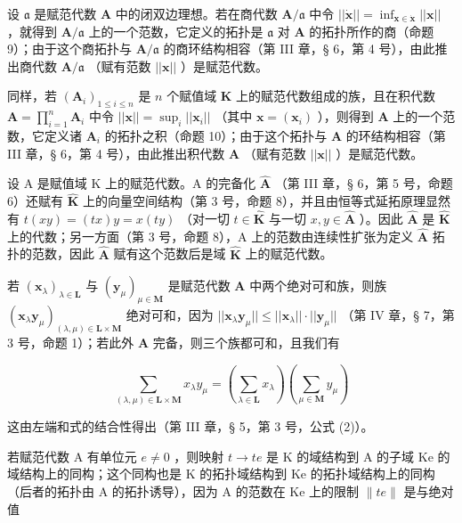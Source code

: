 设 \(\mathfrak{a}\) 是赋范代数 \(\mathbf{A}\) 中的闭双边理想。若在商代数 \(\mathbf{A} / \mathfrak{a}\) 中令 \(||\dot{\mathbf{x}}|| = \inf_{\mathbf{x}\in \dot{\mathbf{x}}}||\mathbf{x}||\) ，就得到 \(\mathbf{A} / \mathfrak{a}\) 上的一个范数，它定义的拓扑是 \(\mathfrak{a}\) 对 \(\mathbf{A}\) 的拓扑所作的商（命题 9）；由于这个商拓扑与 \(\mathbf{A} / \mathfrak{a}\) 的商环结构相容（第 III 章，§ 6，第 4 号），由此推出商代数 \(\mathbf{A} / \mathfrak{a}\) （赋有范数 \(||\mathbf{x}||\) ）是赋范代数。

同样，若 \((\mathbf{A}_i)_{1 \leqslant i \leqslant n}\) 是 \(n\) 个赋值域 \(\mathbf{K}\) 上的赋范代数组成的族，且在积代数 \(\mathbf{A} = \prod_{i=1}^{n} \mathbf{A}_i\) 中令 \(||\boldsymbol{x}|| = \sup_{i} ||\boldsymbol{x}_i||\) （其中 \(\boldsymbol{x} = (\boldsymbol{x}_i)\) ），则得到 \(\mathbf{A}\) 上的一个范数，它定义诸 \(\mathbf{A}_i\) 的拓扑之积（命题 10）；由于这个拓扑与 \(\mathbf{A}\) 的环结构相容（第 III 章，§ 6，第 4 号），由此推出积代数 \(\mathbf{A}\) （赋有范数 \(||\boldsymbol{x}||\) ）是赋范代数。

设 A 是赋值域 K 上的赋范代数。A 的完备化 \(\hat{\mathbf{A}}\) （第 III 章，§ 6，第 5 号，命题 6）还赋有 \(\hat{\mathbf{K}}\) 上的向量空间结构（第 3 号，命题 8），并且由恒等式延拓原理显然有 \(t(xy) = (tx)y = x(ty)\) （对一切 \(t \in \hat{\mathbf{K}}\) 与一切 \(x, y \in \hat{\mathbf{A}}\) ）。因此 \(\hat{\mathbf{A}}\) 是 \(\hat{\mathbf{K}}\) 上的代数；另一方面（第 3 号，命题 8），A 上的范数由连续性扩张为定义 \(\hat{\mathbf{A}}\) 拓扑的范数，因此 \(\hat{\mathbf{A}}\) 赋有这个范数后是域 \(\hat{\mathbf{K}}\) 上的赋范代数。

若 \((\pmb{x}_{\lambda})_{\lambda \in \mathbf{L}}\) 与 \((\pmb{y}_{\mu})_{\mu \in \mathbf{M}}\) 是赋范代数 \(\mathbf{A}\) 中两个绝对可和族，则族 \((\pmb{x}_{\lambda}\pmb{y}_{\mu})_{(\lambda, \mu) \in \mathbf{L} \times \mathbf{M}}\) 绝对可和，因为 \(||\pmb{x}_{\lambda}\pmb{y}_{\mu}|| \leqslant ||\pmb{x}_{\lambda}|| \cdot ||\pmb{y}_{\mu}||\) （第 IV 章，§ 7，第 3 号，命题 1）；若此外 \(\mathbf{A}\) 完备，则三个族都可和，且我们有

\[
\sum_ {(\lambda , \mu) \in \mathbf {L} \times \mathbf {M}} x _ {\lambda} y _ {\mu} = \left(\sum_ {\lambda \in \mathbf {L}} x _ {\lambda}\right) \left(\sum_ {\mu \in \mathbf {M}} y _ {\mu}\right)
\]

这由左端和式的结合性得出（第 III 章，§ 5，第 3 号，公式 (2)）。

若赋范代数 A 有单位元 \(e \neq 0\) ，则映射 \(t \rightarrow te\) 是 K 的域结构到 A 的子域 Ke 的域结构上的同构；这个同构也是 K 的拓扑域结构到 Ke 的拓扑域结构上的同构（后者的拓扑由 A 的拓扑诱导），因为 A 的范数在 Ke 上的限制 \(\|te\|\) 是与绝对值

